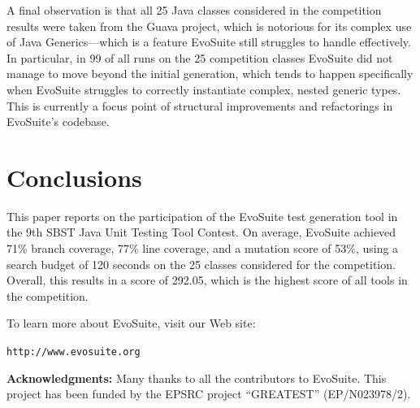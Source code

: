 \documentclass[10pt,conference]{IEEEtran}
\newcommand{\EVOSUITE}{{\sc EvoSuite}\xspace}
\begin{document}
A final observation is that all 25 Java classes considered in the competition
results were taken from the Guava project, which is notorious for its complex
use of Java Generics---which is a feature \EVOSUITE still struggles to handle
effectively. In particular, in 99 of all runs on the 25 competition classes
\EVOSUITE did not manage to move beyond the initial generation, which tends to
happen specifically when \EVOSUITE struggles to correctly instantiate complex,
nested generic types. This is currently a focus point of structural
improvements and refactorings in \EVOSUITE's codebase.






\section{Conclusions}

This paper reports on the participation of the \EVOSUITE test generation tool
in the 9th SBST Java Unit Testing Tool Contest. On average, \EVOSUITE achieved
71\% branch coverage, 77\% line coverage, and a mutation score of 53\%, using a
search budget of 120 seconds on the 25 classes considered for the competition.
Overall, this results in a score of 292.05, which is the highest score of all
tools in the competition.


To learn more about \EVOSUITE, visit our Web site:
\begin{center}
\texttt{http://www.evosuite.org}
\end{center}



\textbf{Acknowledgments:} Many thanks to all the contributors to \EVOSUITE.
This project has been funded by the EPSRC project ``GREATEST'' (EP/N023978/2).




\balance
\end{document}
